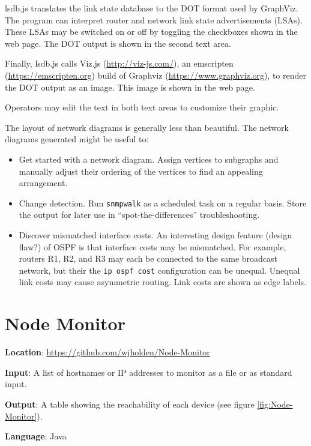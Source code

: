 \documentclass[12pt]{article}
\begin{document}
lsdb.js translates the link state database to the DOT format used by GraphViz. The program can interpret router and network link state advertisements (LSAs). These LSAs may be switched on or off by toggling the checkboxes shown in the web page. The DOT output is shown in the second text area.

Finally, lsdb.js calls Viz.js (\url{http://viz-js.com/}), an emscripten (\url{https://emscripten.org}) build of Graphviz (\url{https://www.graphviz.org}), to render the DOT output as an image. This image is shown in the web page.

Operators may edit the text in both text areas to customize their graphic.

The layout of network diagrams is generally less than beautiful. The network diagrams generated might be useful to:

\begin{itemize}
	\item Get started with a network diagram. Assign vertices to subgraphs and manually adjust their ordering of the vertices to find an appealing arrangement.
	\item Change detection. Run \texttt{snmpwalk} as a scheduled task on a regular basis. Store the output for later use in ``spot-the-differences'' troubleshooting.
	\item Discover mismatched interface costs. An interesting design feature (design flaw?) of OSPF is that interface costs may be mismatched. For example, routers R1, R2, and R3 may each be connected to the same broadcast network, but their the \texttt{ip ospf cost} configuration can be unequal. Unequal link costs may cause asymmetric routing. Link costs are shown as edge labels.	
\end{itemize}

\section{Node Monitor}

\textbf{Location}: \url{https://github.com/wjholden/Node-Monitor}

\textbf{Input}: A list of hostnames or IP addresses to monitor as a file or as standard input.

\textbf{Output}: A table showing the reachability of each device (see figure \ref{fig:Node-Monitor}).

\textbf{Language}: Java
\end{document}
